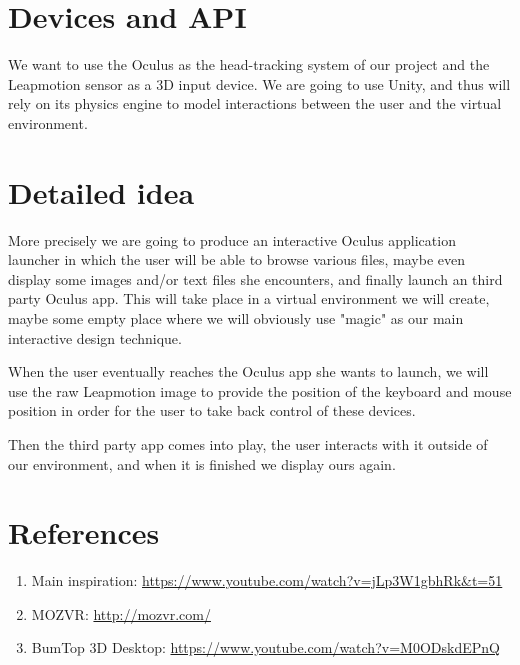 \documentclass[paper=a4, fontsize=11pt]{scrartcl} %
\numberwithin{equation}{section} %
\numberwithin{figure}{section} %
\numberwithin{table}{section} %
\begin{document}

\section{Devices and API}
We want to use the Oculus as the head-tracking system of our project and the Leapmotion sensor as a 3D input device. We are going to use Unity, and thus will rely on its physics engine to model interactions between the user and the virtual environment.


\section{Detailed idea}
More precisely we are going to produce an interactive Oculus application launcher in which the user will be able to browse various files, maybe even display some images and/or text files she encounters, and finally launch an third party Oculus app. This will take place in a virtual environment we will create, maybe some empty place where we will obviously use "magic" as our main interactive design technique.

When the user eventually reaches the Oculus app she wants to launch, we will use the raw Leapmotion image to provide the position of the keyboard and mouse position in order for the user to take back control of these devices. 

Then the third party app comes into play, the user interacts with it outside of our environment, and when it is finished we display ours again.


\section{References}
\label{sec:refs}
\begin{enumerate}
\item Main inspiration: \url{https://www.youtube.com/watch?v=jLp3W1gbhRk&t=51}
\item MOZVR: \url{http://mozvr.com/}
\item BumTop 3D Desktop: \url{https://www.youtube.com/watch?v=M0ODskdEPnQ}
\end{enumerate}


\end{document}
